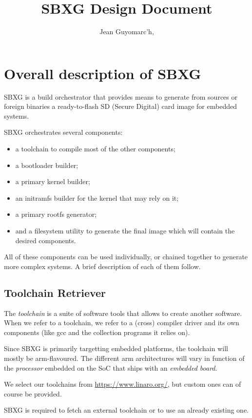 \documentclass{article}
\title{SBXG Design Document}
\date{}
\author{%
  Jean Guyomarc'h, \email{jean@guyomarch.bzh}%
}
\begin{document}
\maketitle

\section{Overall description of SBXG}

SBXG is a build orchestrator that provides means to generate from sources or
foreign binaries a ready-to-flash SD (Secure Digital) card image for embedded systems.

SBXG orchestrates several components:
\begin{itemize}
\item a toolchain to compile most of the other components;
\item a bootloader builder;
\item a primary kernel builder;
\item an initramfs builder for the kernel that may rely on it;
\item a primary rootfs generator;
\item and a filesystem utility to generate the final image which will contain the
  desired components.
\end{itemize}

All of these components can be used individually, or chained together to
generate more complex systems. A brief description of each of them follow.

\subsection{Toolchain Retriever}

The \emph{toolchain} is a suite of software tools that allows to create another
software. When we refer to a toolchain, we refer to a (cross) compiler driver
and its own components (like gcc and the collection programs it relies on).

Since SBXG is primarily targetting embedded platforms, the toolchain will mostly
be arm-flavoured. The different arm architectures will vary in function of the
\emph{processor} embedded on the SoC that ships with an \emph{embedded board}.

We select our toolchains from \url{https://www.linaro.org/}, but custom ones can
of course be provided.

\begin{requirement}
  SBXG is required to fetch an external toolchain or to use an already existing
  one.
\end{requirement} 
\end{document}
